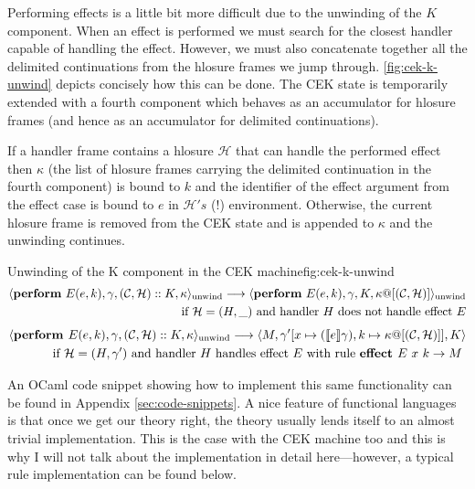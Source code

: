 \documentclass[class=article, crop=false]{standalone}
\begin{document}
Performing effects is a little bit more difficult due to the unwinding of the
$K$ component. When an effect is performed we must search for the closest
handler capable of handling the effect. However, we must also concatenate
together all the delimited continuations from the hlosure frames we jump
through. \autoref{fig:cek-k-unwind} depicts concisely how this can be done. The
CEK state is temporarily extended with a fourth component which behaves as an
accumulator for hlosure frames (and hence as an accumulator for delimited
continuations).

If a handler frame contains a hlosure $\mathcal{H}$ that can handle the
performed effect then $\kappa$ (the list of hlosure frames carrying the
delimited continuation in the fourth component) is bound to $k$ and the
identifier of the effect argument from the effect case is bound to $e$ in
$\mathcal{H}'s$ (!) environment. Otherwise, the current hlosure frame is
removed from the CEK state and is appended to $\kappa$ and the unwinding
continues.

\begin{myfigure}[.95]{Unwinding of the K component in the CEK machine}{fig:cek-k-unwind}
    \begin{align*}
        \cek{ \effPerform E(e,k), \gamma, (\konts, \hlosure) :: K, \kappa}_\text{unwind} \longrightarrow
        \cek{ \effPerform E(e,k), \gamma, K, \kappa@[(\konts, \hlosure)] }_\text{unwind} \\
        \text{ if $\hlosure = (H, \_)$ and handler $H$ does not handle effect $E$}
        \end{align*}
        \begin{align*}
        \langle  \textbf{perform } E(e,k), \gamma, (\mathcal{C}, \mathcal{H}) :: K, \kappa \rangle_\text{unwind} \longrightarrow
        \langle  M, \gamma' [x \mapsto (\llbracket e \rrbracket\gamma), k \mapsto \kappa @ [(\mathcal{C}, \mathcal{H})]], K \rangle \\
        \text{ if $\mathcal{H} = (H, \gamma')$ and handler $H$ handles effect $E$ with rule $\textbf{effect } E\ x \ k \to M$ }
        \end{align*}
\end{myfigure}

An OCaml code snippet showing how to implement this same functionality can be
found in Appendix \autoref{sec:code-snippets}. A nice feature of functional
languages is that once we get our theory right, the theory usually lends
itself to an almost trivial implementation. This is the case with the CEK
machine too and this is why I will not talk about the implementation in
detail here---however, a typical rule implementation can be found below.
\end{document}
